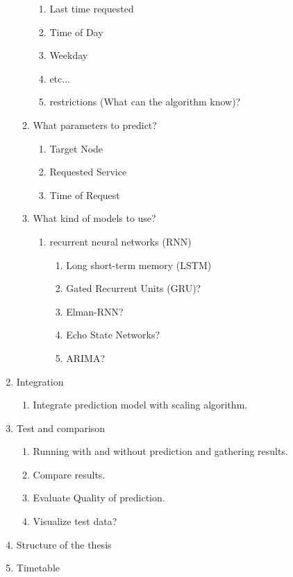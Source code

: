 \documentclass[10pt,a4paper]{article}
\begin{document}
\begin{enumerate}[label*=\arabic*.]
\begin{enumerate}[label*=\arabic*.]
\begin{enumerate}[label*=\arabic*.]
				\item Last time requested
				\item Time of Day
				\item Weekday
				\item etc...
				\item restrictions (What can the algorithm know)?
			\end{enumerate}
			\item What parameters to predict?
			\begin{enumerate}[label*=\arabic*.]
				\item Target Node
				\item Requested Service
				\item Time of Request
			\end{enumerate}
			\item What kind of models to use?
			\begin{enumerate}[label*=\arabic*.]
				\item recurrent neural networks (RNN)
				\begin{enumerate}[label*=\arabic*.]
					\item Long short-term memory (LSTM)
					\item Gated Recurrent Units (GRU)?
					\item Elman-RNN?
					\item Echo State Networks?
					\item ARIMA?
				\end{enumerate}				
			\end{enumerate}
		\end{enumerate}
		\item Integration
		\begin{enumerate}[label*=\arabic*.]
			\item Integrate prediction model with scaling algorithm.
		\end{enumerate}
		\item Test and comparison
		\begin{enumerate}[label*=\arabic*.]
			\item Running with and without prediction and gathering results.
			\item Compare results.
			\item Evaluate Quality of prediction.
			\item Visualize test data?
		\end{enumerate}
		\item Structure of the thesis
		\item Timetable
	\end{enumerate}
\end{document}
